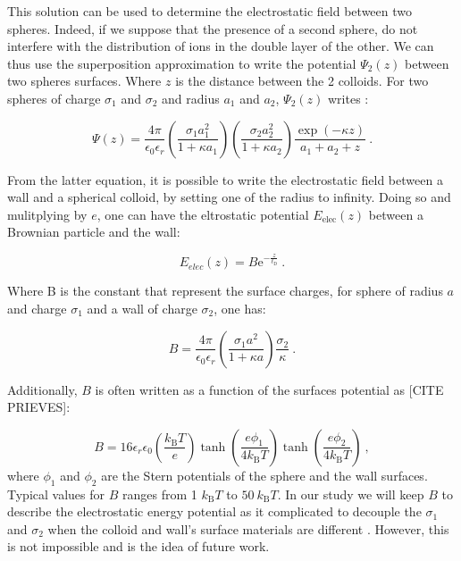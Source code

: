 This solution can be used to determine the  electrostatic field between two spheres. Indeed, if we suppose that the presence of a second sphere, do not interfere with the distribution of ions in the double layer of the other. We can thus use the superposition approximation to write the potential $\Psi _2 (z)$ between two spheres surfaces. Where $z$ is the distance between the 2 colloids. For two spheres of charge $\sigma_1$ and $\sigma_2$ and radius $a_1$ and $a_2$, $\Psi_2 (z)$ writes \cite{bell_approximate_1970}:

\begin{equation}
	\Psi(z) = \frac{4\pi}{\epsilon_0 \epsilon_r} 
	\left(
	\frac{\sigma_1 a_1 ^2}{1 + \kappa a_1}
	\right)
	\left(
	\frac{\sigma_2 a_2 ^2}{1 + \kappa a_2}
	\right)
	\frac{\exp(-\kappa z)}{a_1 + a_2 + z} ~.
\end{equation} 

From the latter equation, it is possible to write the electrostatic field between a wall and a spherical colloid, by setting one of the radius to infinity. Doing so and mulitplying by $e$, one can have the eltrostatic potential $E_\mathrm{elec}(z)$ between a Brownian particle and the wall:

\begin{equation}
	E_{elec} (z) = B \mathrm{e}^{-\frac{z}{\ell_\mathrm{D}}}~.
	\label{Eq:Uelec}
\end{equation}

Where B is the constant that represent the surface charges, for sphere of radius $a$ and charge $\sigma_1$ and a wall of charge $\sigma_2$, one has:

\begin{equation}
	B = \frac{4 \pi}{\epsilon_0 \epsilon_r} \left( \frac{\sigma_1 a^2 }{1 + \kappa a}  \right) \frac{\sigma_2}{\kappa} ~.
\end{equation}

 Additionally, $B$ is often written as a function of the surfaces potential as [CITE PRIEVES]:

\begin{equation}
	B = 16 \epsilon_r \epsilon_0 \left(\frac{k_\mathrm{B}T}{e}\right) \tanh \left(\frac{e\phi_1}{4k_\mathrm{B}T}\right) \tanh \left(\frac{e\phi_2}{4k_\mathrm{B}T}\right) ~,
\end{equation}
 where $\phi_1$ and $\phi_2$ are the Stern potentials of the sphere and the wall surfaces. Typical values for $B$ ranges from 1 $k_\mathrm{B}T$ to $50 ~ k_\mathrm{B}T$. In our study we will keep $B$ to describe the electrostatic energy potential as it complicated to decouple the $\sigma_1$ and $\sigma_2$ when the colloid and wall's surface materials are different \cite{behrens_charge_2001}. However, this is not impossible and is the idea of future work.

